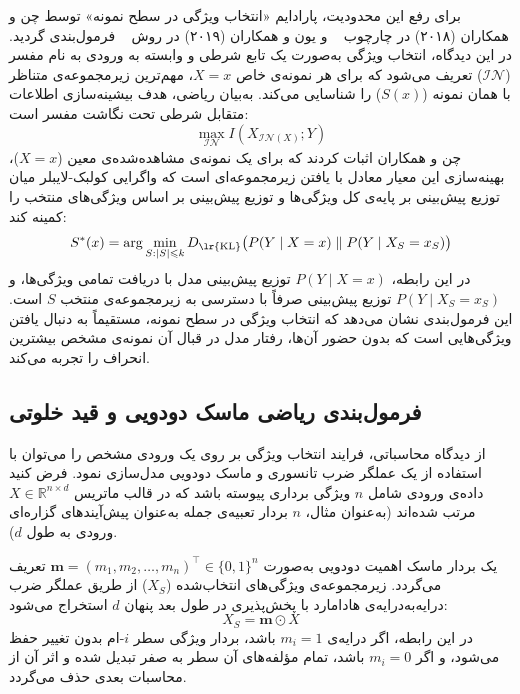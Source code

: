برای رفع این محدودیت، پارادایم «انتخاب ویژگی در سطح نمونه» توسط چن و همکاران (۲۰۱۸) در چارچوب ~\cite{chen2018learning} و یون و همکاران (۲۰۱۹) در روش ~\cite{yoon2019invase} فرمول‌بندی گردید. در این دیدگاه، انتخاب ویژگی به‌صورت یک تابع شرطی و وابسته به ورودی به نام مفسر ($\mathcal{IN}$) تعریف می‌شود که برای هر نمونه‌ی خاص $X=x$، مهم‌ترین زیرمجموعه‌ی متناظر با همان نمونه ($S(x)$) را شناسایی می‌کند. به‌بیان ریاضی، هدف بیشینه‌سازی اطلاعات متقابل شرطی تحت نگاشت مفسر است:
\begin{equation}\label{eq:chap2_local_fs}
    \max_{\mathcal{IN}} I(X_{\mathcal{IN}(X)}; Y)
\end{equation}
چن و همکاران اثبات کردند که برای یک نمونه‌ی مشاهده‌شده‌ی معین ($X=x$)، بهینه‌سازی این معیار معادل با یافتن زیرمجموعه‌ای است که واگرایی کولبک-لایبلر میان توزیع پیش‌بینی بر پایه‌ی کل ویژگی‌ها و توزیع پیش‌بینی بر اساس ویژگی‌های منتخب را کمینه کند:
\begin{equation}\label{eq:chap2_l2x_kl_opt}
    S^*(x) = \arg\min_{S: |S| \le k} D_{\text{\lr{KL}}}\big(P(Y \mid X=x) \parallel P(Y \mid X_S = x_S)\big)
\end{equation}
در این رابطه، $P(Y \mid X=x)$ توزیع پیش‌بینی مدل با دریافت تمامی ویژگی‌ها، و $P(Y \mid X_S = x_S)$ توزیع پیش‌بینی صرفاً با دسترسی به زیرمجموعه‌ی منتخب $S$ است. این فرمول‌بندی نشان می‌دهد که انتخاب ویژگی در سطح نمونه، مستقیماً به دنبال یافتن ویژگی‌هایی است که بدون حضور آن‌ها، رفتار مدل در قبال آن نمونه‌ی مشخص بیشترین انحراف را تجربه می‌کند.


\subsection{فرمول‌بندی ریاضی ماسک دودویی و قید خلوتی}\label{sec:2-5-2}

از دیدگاه محاسباتی، فرایند انتخاب ویژگی بر روی یک ورودی مشخص را می‌توان با استفاده از یک عملگر ضرب تانسوری و ماسک دودویی مدل‌سازی نمود. فرض کنید داده‌ی ورودی شامل $n$ ویژگی برداری پیوسته باشد که در قالب ماتریس $X \in \mathbb{R}^{n \times d}$ مرتب شده‌اند (به‌عنوان مثال، $n$ بردار تعبیه‌ی جمله به‌عنوان پیش‌آیندهای گزاره‌ای ورودی به طول $d$).

یک بردار ماسک اهمیت دودویی به‌صورت $\mathbf{m} = {(m_1, m_2, \dots, m_n)}^\top \in {\{0, 1\}}^n$ تعریف می‌گردد. زیرمجموعه‌ی ویژگی‌های انتخاب‌شده ($X_S$) از طریق عملگر ضرب درایه‌به‌درایه‌ی هادامارد با پخش‌پذیری در طول بعد پنهان $d$ استخراج می‌شود:
\begin{equation}\label{eq:chap2_masking}
    X_S = \mathbf{m} \odot X
\end{equation}
در این رابطه، اگر درایه‌ی $m_i = 1$ باشد، بردار ویژگی سطر $i$-ام بدون تغییر حفظ می‌شود، و اگر $m_i = 0$ باشد، تمام مؤلفه‌های آن سطر به صفر تبدیل شده و اثر آن از محاسبات بعدی حذف می‌گردد.


